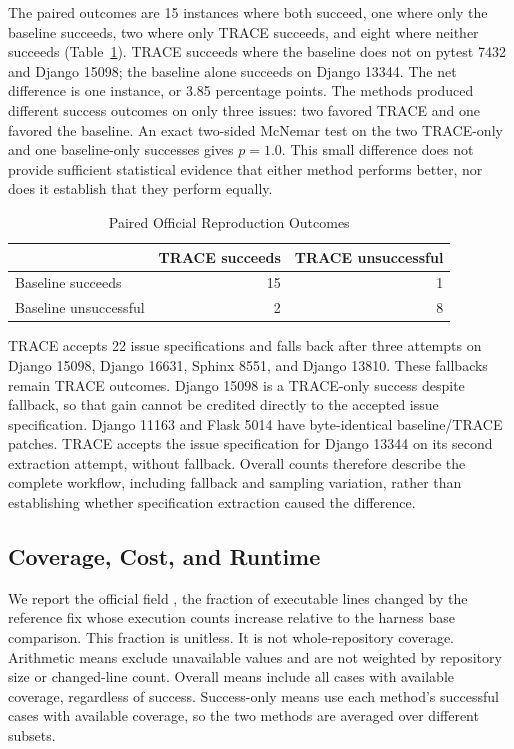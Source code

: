 The paired outcomes are 15 instances where both succeed, one where only the baseline succeeds, two where only TRACE succeeds, and eight where neither succeeds (Table~\ref{tab:paired}). TRACE succeeds where the baseline does not on pytest 7432 and Django 15098; the baseline alone succeeds on Django 13344. The net difference is one instance, or 3.85 percentage points. The methods produced different success outcomes on only three issues: two favored TRACE and one favored the baseline. An exact two-sided McNemar test on the two TRACE-only and one baseline-only successes gives $p=1.0$. This small difference does not provide sufficient statistical evidence that either method performs better, nor does it establish that they perform equally.

\begin{table}[t]
\caption{Paired Official Reproduction Outcomes}
\label{tab:paired}
\centering\small
\begin{tabular}{lrr}
\toprule
 & TRACE succeeds & TRACE unsuccessful\\
\midrule
Baseline succeeds & 15 & 1\\
Baseline unsuccessful & 2 & 8\\
\bottomrule
\end{tabular}
\end{table}

TRACE accepts 22 issue specifications and falls back after three attempts on Django 15098, Django 16631, Sphinx 8551, and Django 13810. These fallbacks remain TRACE outcomes. Django 15098 is a TRACE-only success despite fallback, so that gain cannot be credited directly to the accepted issue specification. Django 11163 and Flask 5014 have byte-identical baseline/TRACE patches. TRACE accepts the issue specification for Django 13344 on its second extraction attempt, without fallback. Overall counts therefore describe the complete workflow, including fallback and sampling variation, rather than establishing whether specification extraction caused the difference.

\subsection{Coverage, Cost, and Runtime}
We report the official field , the fraction of executable lines changed by the reference fix whose execution counts increase relative to the harness base comparison. This fraction is unitless. It is not whole-repository coverage. Arithmetic means exclude unavailable values and are not weighted by repository size or changed-line count. Overall means include all cases with available coverage, regardless of success. Success-only means use each method's successful cases with available coverage, so the two methods are averaged over different subsets.


